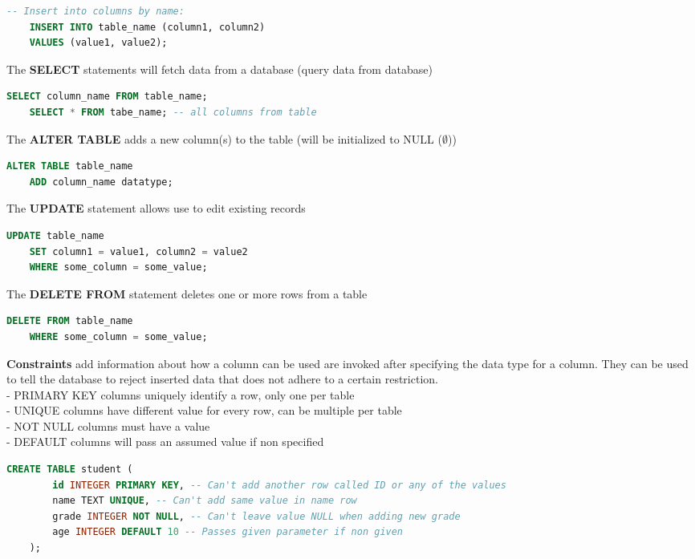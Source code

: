 \documentclass[11pt, a4paper]{article}
\begin{document}
\begin{spacing}{1.1}
\begin{lstlisting}[language=SQL]
	-- Insert into columns by name:
	INSERT INTO table_name (column1, column2)
	VALUES (value1, value2);	\end{lstlisting} \vspace*{1mm}
	The \textbf{SELECT} statements will fetch data from a database (query data from database)
	\begin{lstlisting}[language=SQL]
	SELECT column_name FROM table_name;
	SELECT * FROM tabe_name; -- all columns from table \end{lstlisting} \vspace*{1mm}
	The \textbf{ALTER TABLE} adds a new column(s) to the table (will be initialized to NULL ($\emptyset$))
	\begin{lstlisting}[language=SQL]
	ALTER TABLE table_name
	ADD column_name datatype; \end{lstlisting} \vspace*{1mm}
	The \textbf{UPDATE} statement allows use to edit existing records
	\begin{lstlisting}[language=SQL]
	UPDATE table_name
	SET column1 = value1, column2 = value2
	WHERE some_column = some_value; \end{lstlisting} \vspace*{1mm}
	The \textbf{DELETE FROM} statement deletes one or more rows from a table
	\begin{lstlisting}[language=SQL]
	DELETE FROM table_name
	WHERE some_column = some_value; \end{lstlisting} \newpage
	\noindent \textbf{Constraints} add information about how a column can be used are invoked after specifying the data type for a column. They can be used to tell the database to reject inserted data that does not adhere to a certain restriction. \\
	\hspace*{3mm} - PRIMARY KEY columns uniquely identify a row, only one per table \\
	\hspace*{3mm} - UNIQUE columns have different value for every row, can be multiple per table \\
	\hspace*{3mm} - NOT NULL columns must have a value \\
	\hspace*{3mm} - DEFAULT columns will pass an assumed value if non specified
	\begin{lstlisting}[language=SQL]
	CREATE TABLE student (
		id INTEGER PRIMARY KEY, -- Can't add another row called ID or any of the values
		name TEXT UNIQUE, -- Can't add same value in name row
		grade INTEGER NOT NULL, -- Can't leave value NULL when adding new grade
		age INTEGER DEFAULT 10 -- Passes given parameter if non given
	); \end{lstlisting} \vspace*{5mm}
	

\end{spacing}
\end{document}
